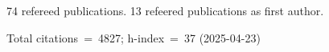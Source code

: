 74 refereed publications. 13 refeered publications as first author.

Total citations~=~4827; h-index~=~37 (2025-04-23)